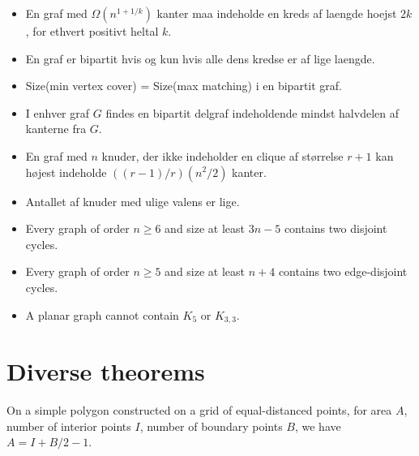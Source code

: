 \documentclass[a4paper,final,8pt]{article}
\begin{document}
\begin{itemize}
\item En graf med $\Omega(n^{1 + 1/k})$ kanter maa indeholde en kreds af laengde hoejst $2k$, for ethvert positivt heltal $k$.

\item En graf er bipartit hvis og kun hvis alle dens kredse er af lige laengde.

\item Size(min vertex cover) = Size(max matching) i en bipartit graf.

\item I enhver graf $G$ findes en bipartit delgraf indeholdende mindst halvdelen af kanterne fra $G$.

\item En graf med $n$ knuder, der ikke indeholder en clique af størrelse $r+1$ kan højest indeholde $((r-1)/r)(n^2/2)$ kanter.

\item Antallet af knuder med ulige valens er lige.

\item Every graph of order $n\ge 6$ and size at least $3n - 5$ contains two disjoint cycles.

\item Every graph of order $n\ge 5$ and size at least $n + 4$ contains two edge-disjoint cycles.

\item A planar graph cannot contain $K_5$ or $K_{3,3}$.
\end{itemize}

\section{Diverse theorems}
On a simple polygon constructed on a grid of equal-distanced points, for area
$A$, number of interior points $I$, number of boundary points $B$, we have
$A=I+B/2-1$.
\end{document}
